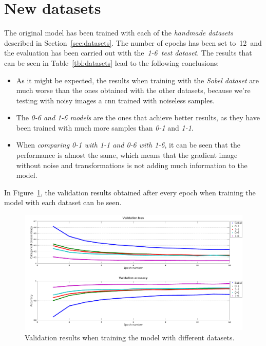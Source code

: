 \section{New datasets}\label{sec:new_datasets}
The original model has been trained with each of the \emph{handmade datasets} described in Section~\ref{sec:datasets}. The number of epochs has been set to~12~and the evaluation has been carried out with the~\emph{1-6~test dataset}. The results that can be seen in Table~\ref{tbl:datasets} lead to the following conclusions:
\begin{itemize}
	\item As it might be expected, the results when training with the \emph{Sobel dataset} are much worse than the ones obtained with the other datasets, because we're testing with noisy images a \gls{cnn} trained with noiseless samples.
	\item The \emph{\textit{0-6} and \textit{1-6} models} are the ones that achieve better results, as they have been trained with much more samples than \textit{0-1} and \textit{1-1}.
	\item When \emph{comparing \textit{0-1} with \textit{1-1} and \textit{0-6} with \textit{1-6}}, it can be seen that the performance is almost the same, which means that the gradient image without noise and transformations is not adding much information to the model.
\end{itemize}
In Figure~\ref{fig:val_datasets}, the validation results obtained after every epoch when training the model with each dataset can be seen.
\begin{figure}
	\centering
	\includegraphics[width=1\linewidth, keepaspectratio]{figures/val_datasets.png}
	\caption{Validation results when training the model with different datasets.}
	\label{fig:val_datasets}
\end{figure}

